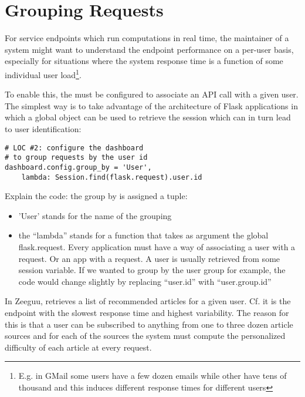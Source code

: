 
\section{Grouping Requests}
\label{sec:user}

For service endpoints which run computations in real time, the maintainer of a system might want to understand the endpoint performance on a per-user basis, especially for situations where the system response time is a function of some individual user load\footnote{E.g. in GMail some users have a few dozen emails while other have tens of  thousand and this induces different response times for different users}.


To enable this, the \tool must be configured to associate an API call with a given user. The simplest way is to take advantage of the architecture of Flask applications in which a global  object can be used to retrieve the session which can in turn lead to user identification: 

\begin{lstlisting}[style=custompython]  
# LOC #2: configure the dashboard
# to group requests by the user id
dashboard.config.group_by = 'User',
	lambda: Session.find(flask.request).user.id

\end{lstlisting}

Explain the code: the group by is assigned a tuple: 

\begin{itemize}
	\item 'User' stands for the name of the grouping
	\item the ``lambda'' stands for a function that takes as argument
	the global flask.request. Every application must have a way of
	associating a user with a request. Or an app with a request. 
	A user is usually retrieved from some session variable. 
	If we wanted to group by the user group for example, the code
	would change slightly by replacing ``user.id'' with ``user.group.id''
\end{itemize}


In Zeeguu, \epFeedItems retrieves a list of recommended articles for a given user. Cf.  it is the endpoint with the slowest response time and highest variability. The reason for this is that a user can be subscribed to anything from one to three dozen article sources and for each of the sources the system must compute the personalized difficulty of each article at every request. 


